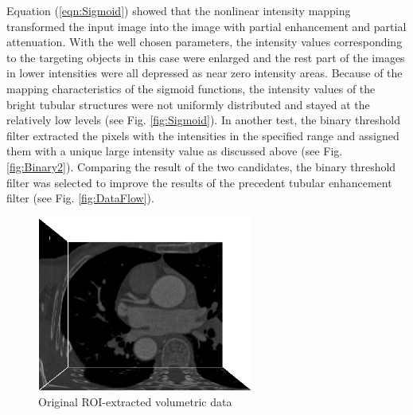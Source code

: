 Equation (\ref{eqn:Sigmoid}) showed that the nonlinear intensity mapping transformed the input image into the image with partial enhancement and partial attenuation.
With the well chosen parameters, the intensity values corresponding to the targeting objects in this case were enlarged and the rest part of the images in lower intensities were all depressed as near zero intensity areas. %
Because of the mapping characteristics of the sigmoid functions, the intensity values of the bright tubular structures were not uniformly distributed and stayed at the relatively low levels (see Fig. \ref{fig:Sigmoid}). %
In another test, the binary threshold filter extracted the pixels with the intensities in the specified range and assigned them with a unique large intensity value as discussed above (see Fig. \ref{fig:Binary2}). %
Comparing the result of the two candidates, the binary threshold filter was selected to improve the results of the precedent tubular enhancement filter (see Fig. \ref{fig:DataFlow}). %
\begin{figure}[tb]
\centering
\includegraphics[width=2.8in]{Figures/original.png}
\caption{Original ROI-extracted volumetric data}
\label{fig:Original}
\end{figure}
